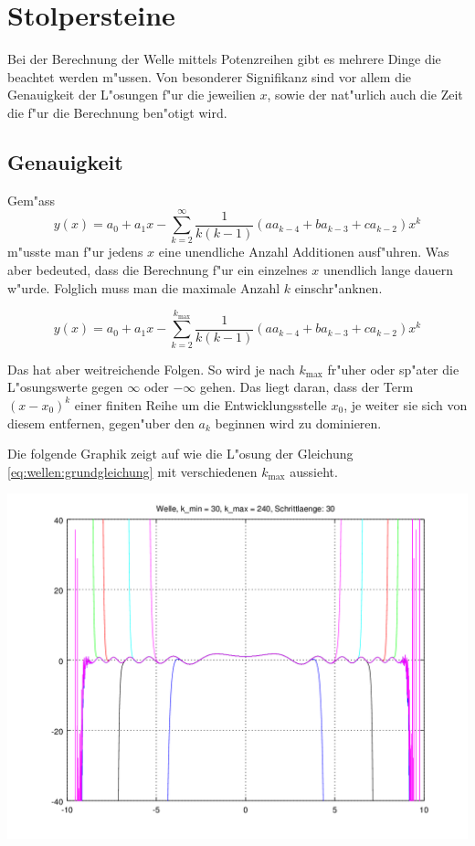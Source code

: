 \section{Stolpersteine}

Bei der Berechnung der Welle mittels Potenzreihen gibt es mehrere Dinge die 
beachtet werden m"ussen. Von besonderer Signifikanz sind vor allem die 
Genauigkeit der L"osungen f"ur die jeweilien $x$, sowie der nat"urlich auch die 
Zeit die f"ur die Berechnung ben"otigt wird.


\subsection{Genauigkeit}
Gem"ass
\begin{equation*}
	y(x) = a_0 + a_1x 
	-\sum_{k=2}^{\infty}\frac{1}{k(k-1)}(aa_{k-4}+ba_{k-3}+ca_{k-2})x^k
\end{equation*}
m"usste man f"ur jedens $x$ eine unendliche Anzahl Additionen ausf"uhren. Was 
aber bedeuted, dass die Berechnung f"ur ein einzelnes $x$ unendlich lange 
dauern w"urde. Folglich muss man die maximale Anzahl $k$ einschr"anknen.

\begin{equation*}
	y(x) = a_0 + a_1x 
	-\sum_{k=2}^{k_{\text{max}}}\frac{1}{k(k-1)}(aa_{k-4}+ba_{k-3}+ca_{k-2})x^k
\end{equation*}

Das hat aber weitreichende Folgen. So wird je nach $k_{\text{max}}$ fr"uher 
oder sp"ater die L"osungswerte gegen $\infty$ oder $-\infty$ gehen. Das liegt 
daran, dass der Term $(x - x_0)^k$ einer finiten Reihe um die 
Entwicklungsstelle $x_0$, je weiter sie sich von diesem entfernen, gegen"uber 
den $a_k$ beginnen wird zu dominieren.

Die folgende Graphik zeigt auf wie die L"osung der Gleichung 
\ref{eq:wellen:grundgleichung} mit verschiedenen $k_{\text{max}}$ aussieht.

\begin{center}
	\includegraphics[scale=0.65]{./wellen/images/kmax/krangewaveeven.png}
\end{center}

